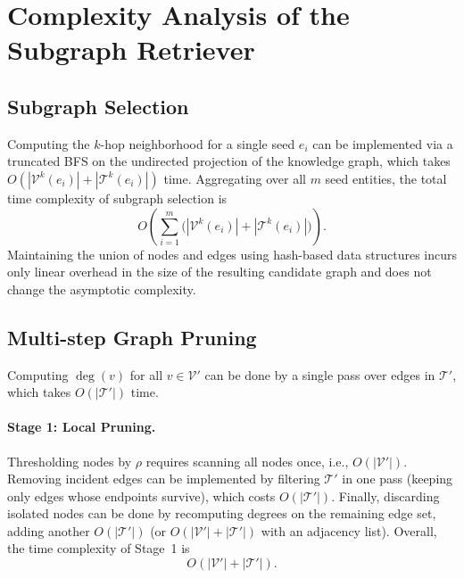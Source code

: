 

\section{Complexity Analysis of the Subgraph Retriever}\label{sec:complexity}
\subsection{Subgraph Selection}
Computing the $k$-hop neighborhood for a single seed $e_i$ can be implemented via a truncated BFS on the undirected projection of the knowledge graph, which takes 
$O(|\mathcal V^k(e_i)| + |\mathcal T^k(e_i)|)$ time.
Aggregating over all $m$ seed entities, the total time complexity of subgraph selection is
\[
O\!\left(\sum_{i=1}^{m} \big(|\mathcal V^k(e_i)| + |\mathcal T^k(e_i)|\big)\right).
\]
Maintaining the union of nodes and edges using hash-based data structures incurs only linear overhead in the size of the resulting candidate graph and does not change the asymptotic complexity.

\subsection{Multi-step Graph Pruning}
Computing $\deg(v)$ for all $v\in\mathcal V'$ can be done by a single pass over edges in $\mathcal T'$, which takes $O(|\mathcal T'|)$ time.

\paragraph{Stage 1: Local Pruning.}
Thresholding nodes by $\rho$ requires scanning all nodes once, i.e., $O(|\mathcal V'|)$.
Removing incident edges can be implemented by filtering $\mathcal T'$ in one pass (keeping only edges whose endpoints survive), which costs $O(|\mathcal T'|)$.
Finally, discarding isolated nodes can be done by recomputing degrees on the remaining edge set, adding another $O(|\mathcal T'|)$ (or $O(|\mathcal V'|+|\mathcal T'|)$ with an adjacency list).
Overall, the time complexity of Stage~1 is
\[
O(|\mathcal V'| + |\mathcal T'|).
\]

